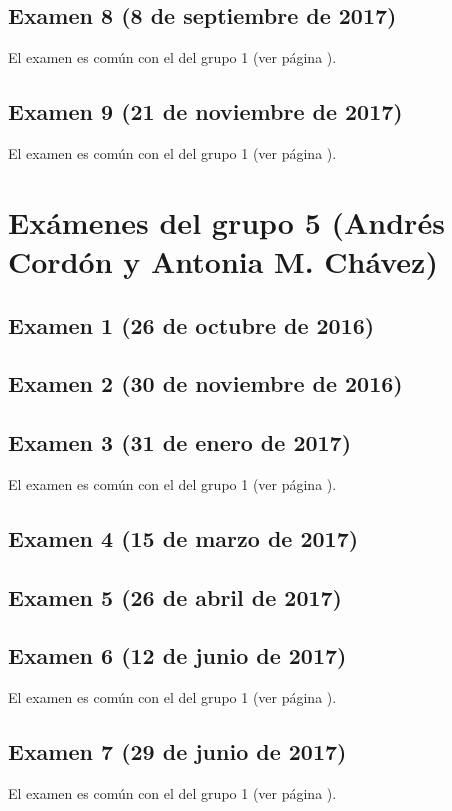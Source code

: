\documentclass[a4paper,12pt,twoside]{book}
\begin{document}
\subsection{Examen 8 (8 de septiembre de 2017)}
El examen es común con el del grupo 1 (ver página \pageref{examen_16_17_4_8}).
\subsection{Examen 9 (21 de noviembre de 2017)}
El examen es común con el del grupo 1 (ver página \pageref{examen_16_17_4_9}).

\section{Exámenes del grupo 5 (Andrés Cordón y Antonia M. Chávez)}
\subsection{Examen 1 (26 de octubre de 2016)}
\subsection{Examen 2 (30 de noviembre de 2016)}
\subsection{Examen 3 (31 de enero de 2017)}
El examen es común con el del grupo 1 (ver página \pageref{examen_16_17_1_3}).
\subsection{Examen 4 (15 de marzo de 2017)}
\subsection{Examen 5 (26 de abril de 2017)}
\subsection{Examen 6 (12 de junio de 2017)}
El examen es común con el del grupo 1 (ver página \pageref{examen_16_17_1_6}).
\subsection{Examen 7 (29 de junio de 2017)}
El examen es común con el del grupo 1 (ver página \pageref{examen_16_17_4_7}).
\end{document}
